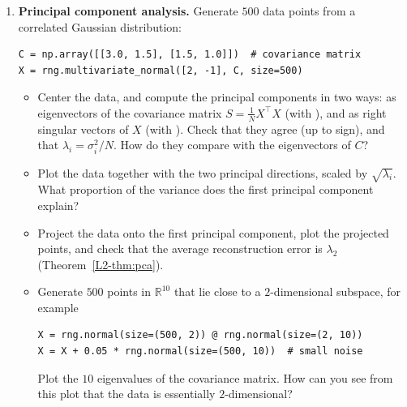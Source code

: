\begin{enumerate}[label=\textbf{P\arabic*.}, leftmargin=*]
    \item \homework{} \textbf{Principal component analysis.} Generate $500$ data points from a correlated Gaussian distribution:
\begin{lstlisting}
C = np.array([[3.0, 1.5], [1.5, 1.0]])  # covariance matrix
X = rng.multivariate_normal([2, -1], C, size=500)
\end{lstlisting}
    \begin{itemize}
        \item Center the data, and compute the principal components in two ways: as eigenvectors of the covariance matrix $S = \frac{1}{N}X^\top X$ (with ), and as right singular vectors of $X$ (with ). Check that they agree (up to sign), and that $\lambda_i = \sigma_i^2 / N$. How do they compare with the eigenvectors of $C$?
        \item Plot the data together with the two principal directions, scaled by $\sqrt{\lambda_i}$. What proportion of the variance does the first principal component explain?
        \item Project the data onto the first principal component, plot the projected points, and check that the average reconstruction error is $\lambda_2$ (Theorem~\ref{L2-thm:pca}).
        \item Generate $500$ points in $\mathbb{R}^{10}$ that lie close to a $2$-dimensional subspace, for example
\begin{lstlisting}
X = rng.normal(size=(500, 2)) @ rng.normal(size=(2, 10))
X = X + 0.05 * rng.normal(size=(500, 10))  # small noise
\end{lstlisting}
        Plot the $10$ eigenvalues of the covariance matrix. How can you see from this plot that the data is essentially $2$-dimensional?
    \end{itemize}


\end{enumerate}
